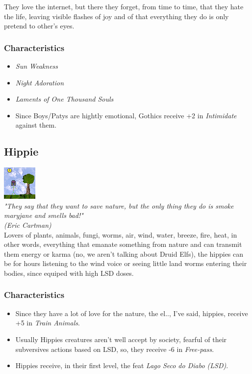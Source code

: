 \documentclass[ letterpaper,12pt]{article}
\begin{document}
They love the internet, but there they forget, from time to time, that they
hate the life, leaving visible flashes of joy and of that everything they do is
only pretend to other's eyes. 

\subsubsection{Characteristics}
\begin{itemize}
\item{\it Sun Weakness}
\item{\it Night Adoration}
\item{\it Laments of One Thousand Souls}
\item{Since Boys/Patys are hightly emotional, Gothics receive +2 in {\it Intimidate} against them.}
\end{itemize}

\subsection{Hippie}
\includegraphics{../data/races/Img/hippie.png}\\
{\it "They say that they want to save nature, but the only thing they do is smoke maryjane and smells bad!"\\ (Eric Cartman)}\\

Lovers of plants, animals, fungi, worms, air, wind, water, breeze, fire, heat,
in other words, everything that emanate something from nature and can transmit
them energy or karma (no, we aren't talking about Druid Elfs), the hippies can
be for hours listening to the wind voice or seeing little land worms entering
their bodies, since equiped with high LSD doses.\\

\subsubsection{Characteristics}
\begin{itemize}
\item{Since they have a lot of love for the nature, the el.., I've said, hippies, receive +5 in {\it Train Animals}.}
\item{Usually Hippies creatures aren't well accept by society, fearful of their subversives actions based on LSD, so, they receive -6 in {\it Free-pass}.}
\item{Hippies receive, in their first level, the feat {\it Lago Seco do Diabo (LSD)}.}
\end{itemize}
\end{document}
